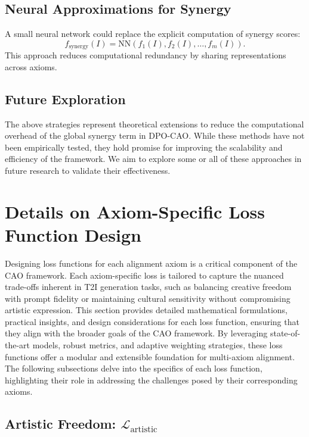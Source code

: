 \subsection{Neural Approximations for Synergy}
A small neural network could replace the explicit computation of synergy scores:
\[
f_{\text{synergy}}(I) = \text{NN}(f_1(I), f_2(I), \dots, f_m(I)).
\]
This approach reduces computational redundancy by sharing representations across axioms.

\subsection{Future Exploration}
The above strategies represent theoretical extensions to reduce the computational overhead of the global synergy term in DPO-CAO. While these methods have not been empirically tested, they hold promise for improving the scalability and efficiency of the framework. We aim to explore some or all of these approaches in future research to validate their effectiveness.





\section{Details on Axiom-Specific Loss Function Design}
\label{sec:appendix_axiom_specific_loss}

Designing loss functions for each alignment axiom is a critical component of the CAO framework. Each axiom-specific loss is tailored to capture the nuanced trade-offs inherent in T2I generation tasks, such as balancing creative freedom with prompt fidelity or maintaining cultural sensitivity without compromising artistic expression. This section provides detailed mathematical formulations, practical insights, and design considerations for each loss function, ensuring that they align with the broader goals of the CAO framework. By leveraging state-of-the-art models, robust metrics, and adaptive weighting strategies, these loss functions offer a modular and extensible foundation for multi-axiom alignment. The following subsections delve into the specifics of each loss function, highlighting their role in addressing the challenges posed by their corresponding axioms.


\subsection{Artistic Freedom: \(\mathcal{L}_{\text{artistic}}\)}

